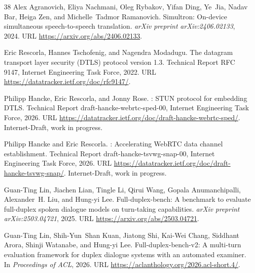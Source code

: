 \documentclass[UTF8,fontset=none,a4paper,10pt]{ctexart}
\begin{document}
{\begin{thebibliography}{38}
Alex Agranovich, Eliya Nachmani, Oleg Rybakov, Yifan Ding, Ye~Jia, Nadav Bar,
  Heiga Zen, and Michelle~Tadmor Ramanovich.
\newblock Simultron: On-device simultaneous speech-to-speech translation.
\newblock \emph{arXiv preprint arXiv:2406.02133}, 2024.
\newblock URL \url{https://arxiv.org/abs/2406.02133}.

Eric Rescorla, Hannes Tschofenig, and Nagendra Modadugu.
\newblock The datagram transport layer security ({DTLS}) protocol version 1.3.
\newblock Technical Report RFC 9147, Internet Engineering Task Force, 2022.
\newblock URL \url{https://datatracker.ietf.org/doc/rfc9147/}.

Philipp Hancke, Eric Rescorla, and Jonny Rose.
: {STUN} protocol for embedding {DTLS}.
\newblock Technical Report draft-hancke-webrtc-sped-00, Internet Engineering
  Task Force, 2026.
\newblock URL \url{https://datatracker.ietf.org/doc/draft-hancke-webrtc-sped/}.
\newblock Internet-Draft, work in progress.

Philipp Hancke and Eric Rescorla.
: Accelerating {WebRTC} data channel establishment.
\newblock Technical Report draft-hancke-tsvwg-snap-00, Internet Engineering
  Task Force, 2026.
\newblock URL \url{https://datatracker.ietf.org/doc/draft-hancke-tsvwg-snap/}.
\newblock Internet-Draft, work in progress.

Guan-Ting Lin, Jiachen Lian, Tingle Li, Qirui Wang, Gopala Anumanchipalli,
  Alexander~H. Liu, and Hung-yi Lee.
\newblock Full-duplex-bench: A benchmark to evaluate full-duplex spoken
  dialogue models on turn-taking capabilities.
\newblock \emph{arXiv preprint arXiv:2503.04721}, 2025.
\newblock URL \url{https://arxiv.org/abs/2503.04721}.

Guan-Ting Lin, Shih-Yun~Shan Kuan, Jiatong Shi, Kai-Wei Chang, Siddhant Arora,
  Shinji Watanabe, and Hung-yi Lee.
\newblock Full-duplex-bench-v2: A multi-turn evaluation framework for duplex
  dialogue systems with an automated examiner.
\newblock In \emph{Proceedings of ACL}, 2026.
\newblock URL \url{https://aclanthology.org/2026.acl-short.4/}.


\end{thebibliography}}
\end{document}
